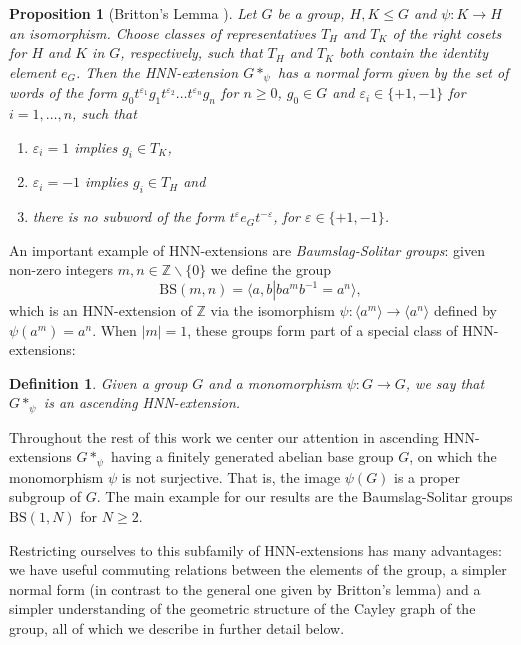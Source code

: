 \documentclass[cupthm,crop,info]{CUP-JNL-ETS}%
\theoremstyle{cupplain}
\newtheorem{proposition}[theorem]{Proposition}
\theoremstyle{cupdefinition}
\newtheorem{definition}{Definition}[section]
\theoremstyle{cupremark}
\theoremstyle{cupproof}
\numberwithin{equation}{section}
\begin{document}
\begin{proposition}[Britton's Lemma {\cite[Theorem~IV.2.1]{lyndon_schupp_1977}}] \label{prop:hnn_general_normal_form}Let $G$ be a group, $H,K\le G$ and $\psi:K\to H$ an isomorphism. 
	Choose classes of representatives $T_H$ and $T_K$ of the right cosets for $H$ and $K$ in $G$, respectively, such that $T_H$ and $T_K$ both contain the identity element $e_G$. Then the HNN-extension $G*_\psi$ has a normal form given by the set of words of the form $g_0t^{\varepsilon_1}g_1t^{\varepsilon_2}\ldots t^{\varepsilon_n}g_n$ for $n\ge 0$, $g_0\in G$ and $\varepsilon_i\in \{+1,-1\}$ for $i=1,\ldots,n$, such that
	\begin{enumerate}
		\item $\varepsilon_i=1 $ implies $g_i\in T_K$,
		\item $\varepsilon_i=-1$ implies $g_i\in T_H$ and 
		\item there is no subword of the form $t^\varepsilon e_G t^{-\varepsilon}$, for $\varepsilon\in\{+1,-1\}$.
	\end{enumerate} 
\end{proposition}

An important example of HNN-extensions are \textit{Baumslag-Solitar groups}: given non-zero integers $m,n\in \mathbb{Z}\backslash\{0\}$ we define the group 
$$\mathrm{BS}(m,n)=\langle a,b \left|\right. ba^mb^{-1}=a^n\rangle,$$ 
which is an HNN-extension of $\mathbb{Z}$ via the isomorphism $\psi:\langle a^m \rangle\to \langle a^n\rangle$ defined by $\psi(a^m)=a^n$. When $|m|=1$, these groups form part of a special class of HNN-extensions:
\begin{definition}\label{def:ascending hnn extension} Given a group $G$ and a monomorphism $\psi:G\to G$, we say that $G*_{\psi}$ is an \textit{ascending HNN-extension}.
\end{definition}

Throughout the rest of this work we center our attention in ascending HNN-extensions $G*_{\psi}$ having a finitely generated abelian base group $G$, on which the monomorphism $\psi$ is not surjective. That is, the image $\psi(G)$ is a proper subgroup of $G$. The main example for our results are the Baumslag-Solitar groups $\mathrm{BS}(1,N)$ for $N\ge 2$.

Restricting ourselves to this subfamily of HNN-extensions has many advantages: we have useful commuting relations between the elements of the group, a simpler normal form (in contrast to the general one given by Britton's lemma) and a simpler understanding of the geometric structure of the Cayley graph of the group, all of which we describe in further detail below.
\end{document}
